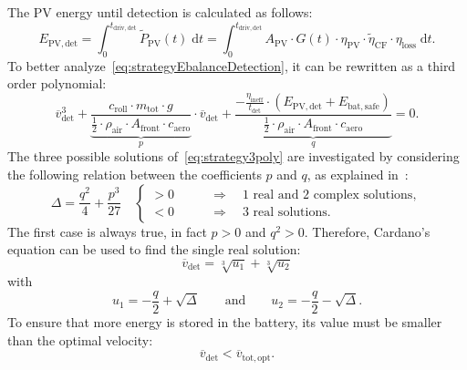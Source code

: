 The PV energy until detection is calculated as follows:
\begin{equation}
	E_\mathrm{PV,det} = \int_{0}^{t_\mathrm{driv,det}} \tilde{P}_\mathrm{PV}(t) \;\mathrm{d}t = \int_{0}^{t_\mathrm{driv,det}} A_\mathrm{PV} \cdot G(t) \cdot \eta_\mathrm{PV} \cdot \tilde{\eta}_\mathrm{CF} \cdot \eta_\mathrm{loss} \;\mathrm{d}t.
\end{equation}
To better analyze~\cref{eq:strategyEbalanceDetection}, it can be rewritten as a third order polynomial:
\begin{equation}
	\overline{v}_\mathrm{det}^3 + \underbrace{\frac{c_\mathrm{roll} \cdot m_\mathrm{tot} \cdot g}{\frac{1}{2} \cdot \rho_\mathrm{air} \cdot A_\mathrm{front} \cdot c_\mathrm{aero}}}_{p} \cdot \overline{v}_\mathrm{det} + \underbrace{\frac{- \frac{\eta_\mathrm{ineff}}{t_\mathrm{det}} \cdot \left(E_\mathrm{PV,det} + E_\mathrm{bat,safe} \right)}{\frac{1}{2} \cdot \rho_\mathrm{air} \cdot A_\mathrm{front} \cdot c_\mathrm{aero}}}_{q} = 0. \label{eq:strategy3poly}
\end{equation}
The three possible solutions of~\cref{eq:strategy3poly} are investigated by considering the following relation between the coefficients $p$ and $q$, as explained in~\cite{wikipediaCardano:2022webpage}:
\begin{equation}
	\Delta = \frac{q^2}{4} + \frac{p^3}{27} \quad
	\begin{cases}
		> 0 \qquad & \Rightarrow \quad \text{1 real and 2 complex solutions}, \\
		< 0 \qquad & \Rightarrow \quad \text{3 real solutions}.
	\end{cases}
\end{equation}
The first case is always true, in fact $p > 0$ and $q^2 > 0$. Therefore, Cardano's equation can be used to find the single real solution:
\begin{equation}
	\overline{v}_\mathrm{det} = \sqrt[3]{u_1} +  \sqrt[3]{u_2}
\end{equation}
with
\begin{equation}
	u_1 = - \frac{q}{2} + \sqrt{\Delta} \qquad \text{and} \qquad u_2 = - \frac{q}{2} - \sqrt{\Delta}.
\end{equation}
To ensure that more energy is stored in the battery, its value must be smaller than the optimal velocity:
\begin{equation}
	\overline{v}_\mathrm{det} < \overline{v}_\mathrm{tot,opt}.
\end{equation}


